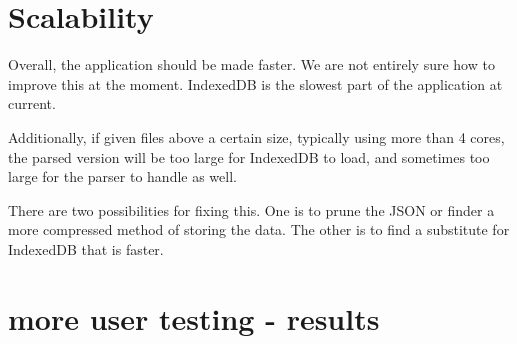 \documentclass{hmcclinic}
\begin{document}
\section{Scalability}
  Overall, the application should be made faster. We are not entirely sure how
  to improve this at the moment. IndexedDB is the slowest part of the
  application at current.

Additionally, if given files above a certain size, typically using more than 4
cores, the parsed version will be too large for IndexedDB to load, and
sometimes too large for the parser to handle as well.

There are two possibilities for fixing this. One is to prune the JSON or
finder a more compressed method of storing the data. The other is to find a
substitute for IndexedDB that is faster.
\section{more user testing - results}
\end{document}
